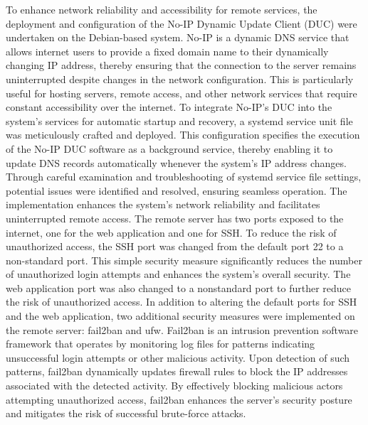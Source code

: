 \documentclass[12pt]{article}
\begin{document}
\newline
\newline
\noindent To enhance network reliability and accessibility for remote services, the deployment and configuration of the No-IP Dynamic Update Client (DUC) were undertaken on the Debian-based system. No-IP is a dynamic DNS service that allows internet users to provide a fixed domain name to their dynamically changing IP address, thereby ensuring that the connection to the server remains uninterrupted despite changes in the network configuration. This is particularly useful for hosting servers, remote access, and other network services that require constant accessibility over the internet. To integrate No-IP's DUC into the system's services for automatic startup and recovery, a systemd service unit file was meticulously crafted and deployed. This configuration specifies the execution of the No-IP DUC software as a background service, thereby enabling it to update DNS records automatically whenever the system's IP address changes. Through careful examination and troubleshooting of systemd service file settings, potential issues were identified and resolved, ensuring seamless operation. The implementation enhances the system's network reliability and facilitates uninterrupted remote access.
\newline
\newline
\noindent The remote server has two ports exposed to the internet, one for the web application and one for SSH. To reduce the risk of unauthorized access, the SSH port was changed from the default port 22 to a non-standard port. This simple security measure significantly reduces the number of unauthorized login attempts and enhances the system's overall security. The web application port was also changed to a nonstandard port to further reduce the risk of unauthorized access. In addition to altering the default ports for SSH and the web application, two additional security measures were implemented on the remote server: fail2ban and ufw.
\newline
\newline
\noindent Fail2ban is an intrusion prevention software framework that operates by monitoring log files for patterns indicating unsuccessful login attempts or other malicious activity. Upon detection of such patterns, fail2ban dynamically updates firewall rules to block the IP addresses associated with the detected activity. By effectively blocking malicious actors attempting unauthorized access, fail2ban enhances the server's security posture and mitigates the risk of successful brute-force attacks.
\end{document}
